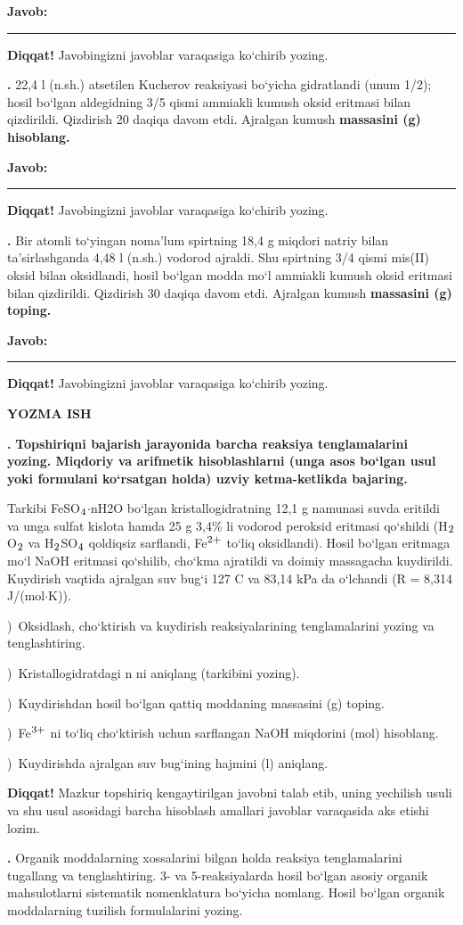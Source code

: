 \documentclass[11pt,a4paper]{article}
\renewcommand{\textsubscript}[1]{\ensuremath{_{\text{\fontsize{8}{8}\selectfont #1}}}}
\renewcommand{\textsuperscript}[1]{\ensuremath{^{\text{\fontsize{8}{8}\selectfont #1}}}}
\newcommand{\qn}[1]{\textbf{\fontsize{11.5}{13}\selectfont #1}}
\newcommand{\qsep}{\par\vspace{13pt}}
\newcommand{\diqqat}[1]{\par\smallskip\noindent\textbf{Diqqat!} #1\par\medskip}
\newcommand{\javob}{\par\nopagebreak[4]\smallskip\noindent\textbf{Javob:} \rule[-2pt]{7.5cm}{0.4pt}\par\smallskip\noindent\textbf{Diqqat!} Javobingizni javoblar varaqasiga ko`chirib yozing.\par\medskip}
\begin{document}
\javob\qsep
\noindent\qn{39.} 22,4 l (n.sh.) atsetilen Kucherov reaksiyasi bo`yicha gidratlandi (unum 1/2); hosil bo`lgan aldegidning 3/5 qismi ammiakli kumush oksid eritmasi bilan qizdirildi. Qizdirish 20 daqiqa davom etdi. Ajralgan kumush \textbf{massasini (g) hisoblang.}
\javob\qsep
\noindent\qn{40.} Bir atomli to`yingan noma'lum spirtning 18,4 g miqdori natriy bilan ta'sirlashganda 4,48 l (n.sh.) vodorod ajraldi. Shu spirtning 3/4 qismi mis(II) oksid bilan oksidlandi, hosil bo`lgan modda mo`l ammiakli kumush oksid eritmasi bilan qizdirildi. Qizdirish 30 daqiqa davom etdi. Ajralgan kumush \textbf{massasini (g) toping.}
\javob\qsep
\par\bigskip\begin{center}\textbf{\fontsize{13}{15}\selectfont YOZMA ISH}\end{center}
\noindent\qn{41.} \textbf{Topshiriqni bajarish jarayonida barcha reaksiya tenglamalarini yozing. Miqdoriy va arifmetik hisoblashlarni (unga asos bo`lgan usul yoki formulani ko`rsatgan holda) uzviy ketma-ketlikda bajaring.}\par\smallskip
Tarkibi FeSO\textsubscript{4}$\cdot$nH2O bo`lgan kristallogidratning 12,1 g namunasi suvda eritildi va unga sulfat kislota hamda 25 g 3,4\% li vodorod peroksid eritmasi qo`shildi (H\textsubscript{2}O\textsubscript{2} va H\textsubscript{2}SO\textsubscript{4} qoldiqsiz sarflandi, Fe\textsuperscript{2+} to`liq oksidlandi). Hosil bo`lgan eritmaga mo`l NaOH eritmasi qo`shilib, cho`kma ajratildi va doimiy massagacha kuydirildi. Kuydirish vaqtida ajralgan suv bug`i 127 \textdegree{}C va 83,14 kPa da o`lchandi (R = 8,314 J/(mol$\cdot$K)).\par
{})\ Oksidlash, cho`ktirish va kuydirish reaksiyalarining tenglamalarini yozing va tenglashtiring.\par
{})\ Kristallogidratdagi n ni aniqlang (tarkibini yozing).\par
{})\ Kuydirishdan hosil bo`lgan qattiq moddaning massasini (g) toping.\par
{})\ Fe\textsuperscript{3+} ni to`liq cho`ktirish uchun sarflangan NaOH miqdorini (mol) hisoblang.\par
{})\ Kuydirishda ajralgan suv bug`ining hajmini (l) aniqlang.\par
\diqqat{Mazkur topshiriq kengaytirilgan javobni talab etib, uning yechilish usuli va shu usul asosidagi barcha hisoblash amallari javoblar varaqasida aks etishi lozim.}\qsep
\noindent\qn{42.} Organik moddalarning xossalarini bilgan holda reaksiya tenglamalarini tugallang va tenglashtiring. 3- va 5-reaksiyalarda hosil bo`lgan asosiy organik mahsulotlarni sistematik nomenklatura bo`yicha nomlang. Hosil bo`lgan organik moddalarning tuzilish formulalarini yozing.\par
\end{document}
